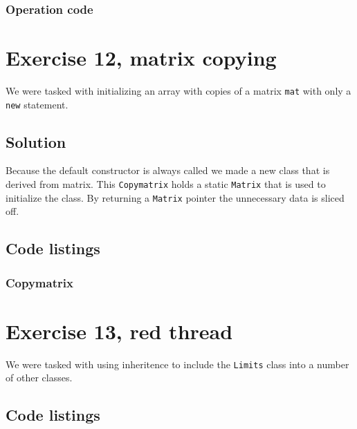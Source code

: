 \documentclass[11pt]{article}
\begin{document}
\subsubsection*{Operation code}





\section*{Exercise 12, matrix copying}
We were tasked with initializing an array with copies of a matrix \texttt{mat} with only a \texttt{new} statement.

\subsection*{Solution}
Because the default constructor is always called we made a new class that is derived from matrix.
This \texttt{Copymatrix} holds a static \texttt{Matrix} that is used to initialize the class.
By returning a \texttt{Matrix} pointer the unnecessary data is sliced off.

\subsection*{Code listings}





\subsubsection*{Copymatrix}




\section*{Exercise 13, red thread}
We were tasked with using inheritence to include the \texttt{Limits} class into a number of other classes.

\subsection*{Code listings}




\end{document}

